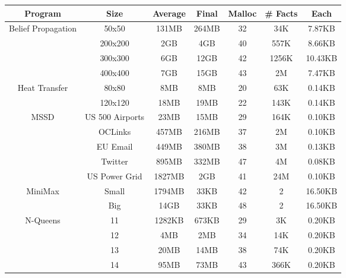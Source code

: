 \begin{tabular}{c | c || c | c | c || c c} \hline
	\textbf{Program} & \textbf{Size} & \textbf{Average} & \textbf{Final} & \textbf{Malloc} & \textbf{\# Facts} & \textbf{Each} \\ \hline \hline
	\multirow{4}{*}{Belief Propagation}  & 50x50 & 131MB & 264MB & 32 & 34K & 7.87KB \\
		 & 200x200 & 2GB & 4GB & 40 & 557K & 8.66KB \\
		 & 300x300 & 6GB & 12GB & 42 & 1256K & 10.43KB \\
		 & 400x400 & 7GB & 15GB & 43 & 2M & 7.47KB \\
	\hline
	\multirow{2}{*}{Heat Transfer}  & 80x80 & 8MB & 8MB & 20 & 63K & 0.14KB \\
		 & 120x120 & 18MB & 19MB & 22 & 143K & 0.14KB \\
	\hline
	\multirow{5}{*}{MSSD}  & US 500 Airports & 23MB & 15MB & 29 & 164K & 0.10KB \\
		 & OCLinks & 457MB & 216MB & 37 & 2M & 0.10KB \\
		 & EU Email & 449MB & 380MB & 38 & 3M & 0.13KB \\
		 & Twitter & 895MB & 332MB & 47 & 4M & 0.08KB \\
		 & US Power Grid & 1827MB & 2GB & 41 & 24M & 0.10KB \\
	\hline
	\multirow{2}{*}{MiniMax}  & Small & 1794MB & 33KB & 42 & 2 & 16.50KB \\
		 & Big & 14GB & 33KB & 48 & 2 & 16.50KB \\
	\hline
	\multirow{4}{*}{N-Queens}  & 11 & 1282KB & 673KB & 29 & 3K & 0.20KB \\
		 & 12 & 4MB & 2MB & 34 & 14K & 0.20KB \\
		 & 13 & 20MB & 14MB & 38 & 74K & 0.20KB \\
		 & 14 & 95MB & 73MB & 43 & 366K & 0.20KB \\
	\hline
\end{tabular}
